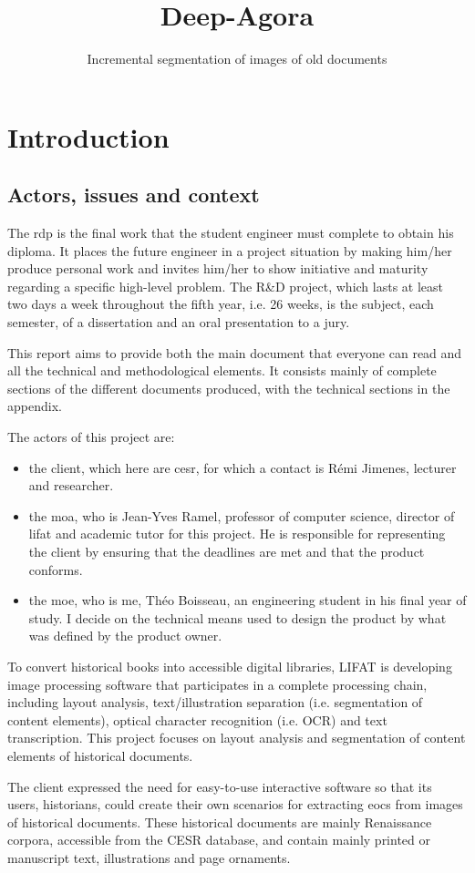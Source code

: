 \documentclass{polytech/polytech}
\title{Deep-Agora}
\subtitle{Incremental segmentation of images of old documents}
\numberwithin{figure}{chapter}
\begin{document}
             
\chapter{Introduction}
\section{Actors, issues and context}

The \gls{rdp} is the final work that the student engineer must complete to obtain his diploma.
It places the future engineer in a project situation by making him/her produce personal work and invites him/her to show initiative and maturity regarding a specific high-level problem.
The R\&D project, which lasts at least two days a week throughout the fifth year, i.e. 26 weeks, is the subject, each semester, of a dissertation and an oral presentation to a jury.

This report aims to provide both the main document that everyone can read and all the technical and methodological elements.
It consists mainly of complete sections of the different documents produced, with the technical sections in the appendix.

The actors of this project are:
\begin{itemize}
\item the client, which here are \gls{cesr}, for which a contact is Rémi Jimenes, lecturer and researcher.
\item the \gls{moa}, who is Jean-Yves Ramel, professor of computer science, director of \gls{lifat} and academic tutor for this project. He is responsible for representing the client by ensuring that the deadlines are met and that the product conforms.
\item the \gls{moe}, who is me, Théo Boisseau, an engineering student in his final year of study. I decide on the technical means used to design the product by what was defined by the product owner.
\end{itemize}

To convert historical books into accessible digital libraries, LIFAT is developing image processing software that participates in a complete processing chain, including layout analysis, text/illustration separation (i.e. segmentation of content elements), optical character recognition (i.e. OCR) and text transcription.
This project focuses on layout analysis and segmentation of content elements of historical documents.

The client expressed the need for easy-to-use interactive software so that its users, historians, could create their own scenarios for extracting \gls{eocs} from images of historical documents. These historical documents are mainly Renaissance corpora, accessible from the CESR database, and contain mainly printed or manuscript text, illustrations and page ornaments.
\end{document}
